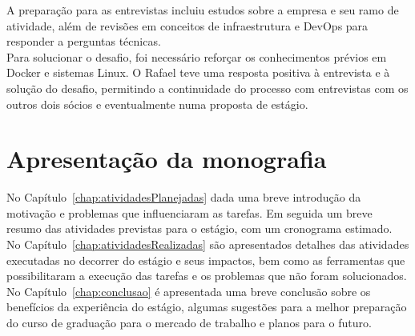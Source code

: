 A preparação para as entrevistas incluiu estudos sobre a empresa e seu ramo de atividade, além de revisões em conceitos de infraestrutura e DevOps para responder a perguntas técnicas.\\

Para solucionar o desafio, foi necessário reforçar os conhecimentos prévios em Docker e sistemas Linux. O Rafael teve uma resposta positiva à entrevista e à solução do desafio, permitindo a continuidade do processo com entrevistas com os outros dois sócios e eventualmente numa proposta de estágio.\\


\section{Apresentação da monografia}

No Capítulo~\ref{chap:atividadesPlanejadas} dada uma breve introdução da motivação e problemas que influenciaram as tarefas. Em seguida um breve resumo das atividades previstas para o estágio, com um cronograma estimado.\\

No Capítulo~\ref{chap:atividadesRealizadas} são apresentados detalhes das atividades executadas no decorrer do estágio e seus impactos, bem como as ferramentas que possibilitaram a execução das tarefas e os problemas que não foram solucionados.\\

No Capítulo~\ref{chap:conclusao} é apresentada uma breve conclusão sobre os benefícios da experiência do estágio, algumas sugestões para a melhor preparação do curso de graduação para o mercado de trabalho e planos para o futuro.\\


